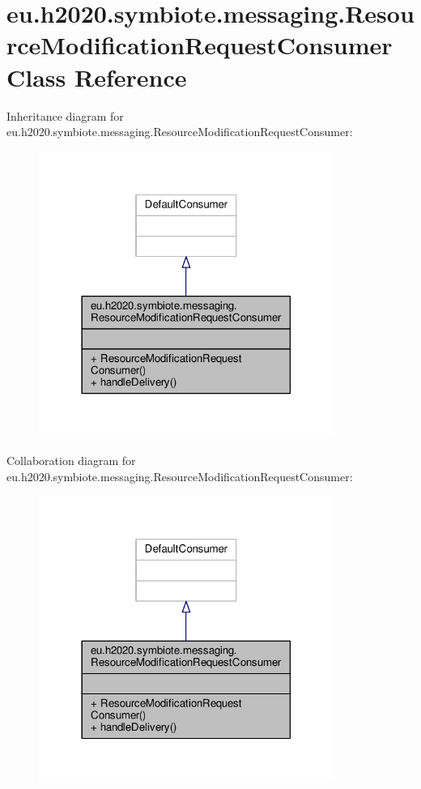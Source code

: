 \hypertarget{classeu_1_1h2020_1_1symbiote_1_1messaging_1_1ResourceModificationRequestConsumer}{}\section{eu.\+h2020.\+symbiote.\+messaging.\+Resource\+Modification\+Request\+Consumer Class Reference}
\label{classeu_1_1h2020_1_1symbiote_1_1messaging_1_1ResourceModificationRequestConsumer}


Inheritance diagram for eu.\+h2020.\+symbiote.\+messaging.\+Resource\+Modification\+Request\+Consumer\+:
\nopagebreak
\begin{figure}[H]
\begin{center}
\leavevmode
\includegraphics[width=273pt]{classeu_1_1h2020_1_1symbiote_1_1messaging_1_1ResourceModificationRequestConsumer__inherit__graph}
\end{center}
\end{figure}


Collaboration diagram for eu.\+h2020.\+symbiote.\+messaging.\+Resource\+Modification\+Request\+Consumer\+:
\nopagebreak
\begin{figure}[H]
\begin{center}
\leavevmode
\includegraphics[width=273pt]{classeu_1_1h2020_1_1symbiote_1_1messaging_1_1ResourceModificationRequestConsumer__coll__graph}
\end{center}
\end{figure}
